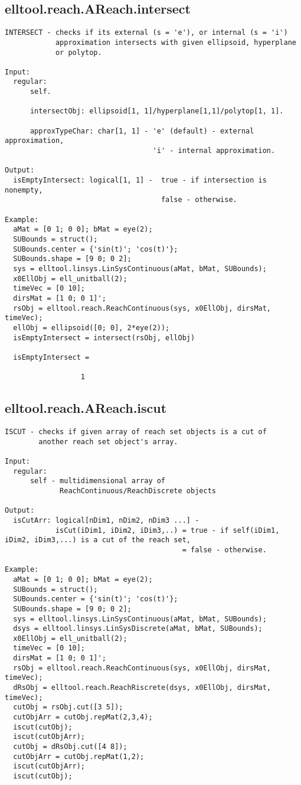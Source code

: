 \subsection{\texorpdfstring{elltool.reach.AReach.intersect}{intersect}}\label{method:elltool.reach.AReach.intersect}
\begin{verbatim}
INTERSECT - checks if its external (s = 'e'), or internal (s = 'i')
            approximation intersects with given ellipsoid, hyperplane
            or polytop.

Input:
  regular:
      self.

      intersectObj: ellipsoid[1, 1]/hyperplane[1,1]/polytop[1, 1].

      approxTypeChar: char[1, 1] - 'e' (default) - external approximation,
                                   'i' - internal approximation.

Output:
  isEmptyIntersect: logical[1, 1] -  true - if intersection is nonempty,
                                     false - otherwise.

Example:
  aMat = [0 1; 0 0]; bMat = eye(2);
  SUBounds = struct();
  SUBounds.center = {'sin(t)'; 'cos(t)'};
  SUBounds.shape = [9 0; 0 2];
  sys = elltool.linsys.LinSysContinuous(aMat, bMat, SUBounds);
  x0EllObj = ell_unitball(2);
  timeVec = [0 10];
  dirsMat = [1 0; 0 1]';
  rsObj = elltool.reach.ReachContinuous(sys, x0EllObj, dirsMat, timeVec);
  ellObj = ellipsoid([0; 0], 2*eye(2));
  isEmptyIntersect = intersect(rsObj, ellObj)

  isEmptyIntersect =

                  1
\end{verbatim}
\subsection{\texorpdfstring{elltool.reach.AReach.iscut}{iscut}}\label{method:elltool.reach.AReach.iscut}
\begin{verbatim}
ISCUT - checks if given array of reach set objects is a cut of
        another reach set object's array.

Input:
  regular:
      self - multidimensional array of
             ReachContinuous/ReachDiscrete objects

Output:
  isCutArr: logical[nDim1, nDim2, nDim3 ...] -
            isCut(iDim1, iDim2, iDim3,..) = true - if self(iDim1, iDim2, iDim3,...) is a cut of the reach set,
                                          = false - otherwise.

Example:
  aMat = [0 1; 0 0]; bMat = eye(2);
  SUBounds = struct();
  SUBounds.center = {'sin(t)'; 'cos(t)'};
  SUBounds.shape = [9 0; 0 2];
  sys = elltool.linsys.LinSysContinuous(aMat, bMat, SUBounds);
  dsys = elltool.linsys.LinSysDiscrete(aMat, bMat, SUBounds);
  x0EllObj = ell_unitball(2);
  timeVec = [0 10];
  dirsMat = [1 0; 0 1]';
  rsObj = elltool.reach.ReachContinuous(sys, x0EllObj, dirsMat, timeVec);
  dRsObj = elltool.reach.ReachRiscrete(dsys, x0EllObj, dirsMat, timeVec);
  cutObj = rsObj.cut([3 5]);
  cutObjArr = cutObj.repMat(2,3,4);
  iscut(cutObj);
  iscut(cutObjArr);
  cutObj = dRsObj.cut([4 8]);
  cutObjArr = cutObj.repMat(1,2);
  iscut(cutObjArr);
  iscut(cutObj);
\end{verbatim}
